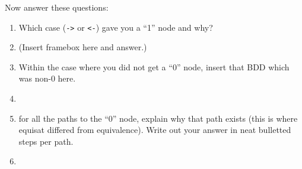 \documentclass[11pt]{article}
\begin{document}
\begin{enumerate}
  Now answer these questions:
  
  \begin{enumerate}
  \item Which case (\verb|->| or \verb|<-|) gave you a ``1'' node and why?

  \item[] (Insert framebox here and answer.)

\begin{minipage}{\minpagw}
\end{minipage}

  \item Within the case
    where you did not get a ``0'' node,
    insert that BDD which was non-0 here.
  \item[]
  \begin{minipage}{\minpagw}
\end{minipage}
  \item
    for all the paths to the ``0'' node,
    explain why that path exists (this is where equisat differed from equivalence).
    Write out your answer in neat bulletted steps per path.
  \item[]
  \begin{minipage}{\minpagw}
\end{minipage}
\end{enumerate}
\end{enumerate}
\end{document}

